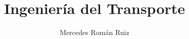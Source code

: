 \documentclass[10pt, a4paper, twoside, twocolumn]{book}
\title{Ingeniería del Transporte}
\author{Mercedes Román Ruiz}
\date{}
\begin{document}
\sloppy 
\setlength{\parindent}{15pt} %
\setlength{\parskip}{5pt} %
\renewcommand\thesection{\arabic{section}}
\renewcommand{\baselinestretch}{1.5}
\renewcommand{\listtablename}{Índice de tablas} %
\renewcommand{\tablename}{Tabla} %
\renewcommand{\baselinestretch}{1.5}

\fancyhead{}
\fancyfoot{}
\pagestyle{fancy}
\chead[\rightmark]{\leftmark}

\fancyfoot[LE,RO]{\thepage}



%

%



\end{document}
